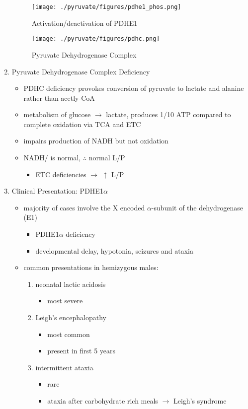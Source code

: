 \documentclass{scrartcl}
\begin{document}
\begin{enumerate}
\begin{figure}[htbp]
\centering
\texttt{[image: ./pyruvate/figures/pdhe1\_phos.png]}
\caption[pdhe1]{\label{fig:org948554b}
Activation/deactivation of PDHE1}
\end{figure}


\begin{figure}[htbp]
\centering
\texttt{[image: ./pyruvate/figures/pdhc.png]}
\caption[pdhc]{\label{fig:orgf47b256}
Pyruvate Dehydrogenase Complex}
\end{figure}

\item Pyruvate Dehydrogenase Complex Deficiency
\label{sec:orgc5845b9}
\begin{itemize}
\item PDHC deficiency provokes conversion of pyruvate to lactate and alanine rather than acetly-CoA
\item metabolism of glucose \(\to\) lactate, produces 1/10 ATP compared to
complete oxidation via TCA and ETC
\item impairs production of NADH but not oxidation
\item NADH/ is normal, \(\therefore\) normal L/P
\begin{itemize}
\item ETC deficiencies \(\to\) \(\uparrow\) L/P
\end{itemize}
\end{itemize}

\item Clinical Presentation: PDHE1\(\alpha\)
\label{sec:org0e359ea}
\begin{itemize}
\item majority of cases involve the X encoded \(\alpha\)-subunit of the dehydrogenase (E1)
\begin{itemize}
\item PDHE1\(\alpha\) deficiency
\item developmental delay, hypotonia, seizures and ataxia
\end{itemize}

\item common presentations in hemizygous males:
\begin{enumerate}
\item neonatal lactic acidosis
\begin{itemize}
\item most severe
\end{itemize}
\item Leigh's encephalopathy
\begin{itemize}
\item most common
\item present in first 5 years
\end{itemize}
\item intermittent ataxia
\begin{itemize}
\item rare
\item ataxia after carbohydrate rich meals \(\to\) Leigh's syndrome
\end{itemize}
\end{enumerate}


\end{itemize}
\end{enumerate}
\end{document}
